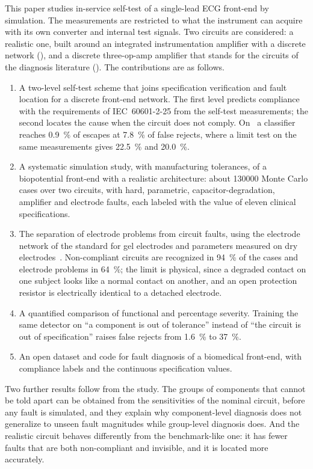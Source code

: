 This paper studies in-service self-test of a single-lead ECG front-end by simulation. The
measurements are restricted to what the instrument can acquire with its own converter and
internal test signals. Two circuits are considered: a realistic one, built around an integrated
instrumentation amplifier with a discrete network (\cA), and a discrete three-op-amp amplifier
that stands for the circuits of the diagnosis literature (\cB). The contributions are as follows.
\begin{enumerate}
\item A two-level self-test scheme that joins specification verification and fault location for a
discrete front-end network. The first level predicts compliance with the requirements of
IEC~60601-2-25 from the self-test measurements; the second locates the cause when the circuit
does not comply. On \cA\ a classifier reaches \SI{0.9}{\percent} of escapes at \SI{7.8}{\percent}
of false rejects, where a limit test on the same measurements gives \SI{22.5}{\percent} and
\SI{20.0}{\percent}.
\item A systematic simulation study, with manufacturing tolerances, of a biopotential front-end
with a realistic architecture: about \num{130000} Monte Carlo cases over two circuits, with hard,
parametric, capacitor-degradation, amplifier and electrode faults, each labeled with the value of
eleven clinical specifications.
\item The separation of electrode problems from circuit faults, using the electrode network of
the standard for gel electrodes and parameters measured on dry
electrodes~\cite{iec60601225,joutsen2024}. Non-compliant circuits are recognized in
\SI{94}{\percent} of the cases and electrode problems in \SI{64}{\percent}; the limit is physical,
since a degraded contact on one subject looks like a normal contact on another, and an open
protection resistor is electrically identical to a detached electrode.
\item A quantified comparison of functional and percentage severity. Training the same detector on
``a component is out of tolerance'' instead of ``the circuit is out of specification'' raises
false rejects from \SI{1.6}{\percent} to \SI{37}{\percent}.
\item An open dataset and code for fault diagnosis of a biomedical front-end, with compliance
labels and the continuous specification values.
\end{enumerate}

Two further results follow from the study. The groups of components that cannot be told apart can
be obtained from the sensitivities of the nominal circuit, before any fault is simulated, and
they explain why component-level diagnosis does not generalize to unseen fault magnitudes while
group-level diagnosis does. And the realistic circuit behaves differently from the benchmark-like
one: it has fewer faults that are both non-compliant and invisible, and it is located more
accurately.

